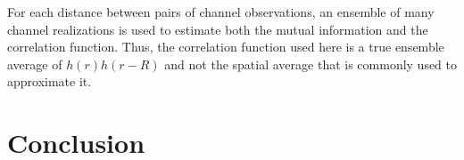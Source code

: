 \documentclass[journal]{IEEEtran}
\begin{document}
For each distance between pairs of channel observations, an ensemble of many channel realizations is used to estimate both the mutual information and the correlation function.  Thus, the correlation function used here is a true ensemble average of $h(r)h(r-R)$ and not the spatial average that is commonly used to approximate it.  %


\section{Conclusion}

{}
\end{document}

